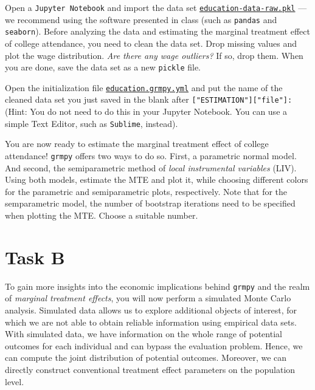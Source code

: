 \begin{boenumerate}

  \item Open a \texttt{Jupyter Notebook} and import the data set \href{https://github.com/HumanCapitalAnalysis/microeconometrics/blob/prset_grmpy/problem-sets/04-generalized-roy-model/data/education_data_raw.pkl}{\texttt{education-data-raw.pkl}} --- we recommend using the software presented in class (such as \texttt{pandas} and \texttt{seaborn}). 
  Before analyzing the data and estimating the marginal treatment effect of college attendance, you need to clean the data set. Drop missing values and plot the wage distribution. \emph{Are there any wage outliers?} If so, drop them.
  When you are done, save the data set as a new \texttt{pickle} file.
  
   \item Open the initialization file \href{https://github.com/HumanCapitalAnalysis/microeconometrics/blob/prset_grmpy/problem-sets/04-generalized-roy-model/sources/education.grmpy.yml}{\texttt{education.grmpy.yml}} and put the name of the cleaned data set you just saved in the blank after \texttt{["ESTIMATION"]["file"]:} (Hint: You do not need to do this in your Jupyter Notebook. You can use a simple Text Editor, such as \texttt{Sublime}, instead).
   
   \item You are now ready to estimate the marginal treatment effect of college attendance! \texttt{grmpy} offers two ways to do so. First, a parametric normal model. And second, the semiparametric method of \emph{local instrumental variables} (LIV).
   Using both models, estimate the MTE and plot it, while choosing different colors for the parametric and semiparametric plots, respectively. Note that for the semparametric model, the number of bootstrap iterations need to be specified when plotting the MTE. Choose a suitable number.

\end{boenumerate}


\section*{Task B}

   To gain more insights into the economic implications behind \texttt{grmpy} and the realm of \emph{marginal treatment effects}, you will now perform a simulated Monte Carlo analysis. 
   Simulated data allows us to explore additional objects of interest, for which we are not able to obtain reliable information using empirical data sets. With simulated data, we have information on the whole range of potential outcomes for each individual and can bypass the evaluation problem. Hence, we can compute the joint distribution of potential outcomes. Moreover, we can directly construct conventional treatment effect parameters on the population level.\\

